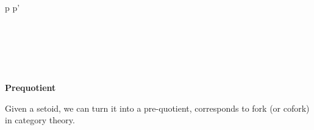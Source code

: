 {\begin{code}
\\
\>    \AgdaSymbol{=}      \AgdaSymbol{\_}  \AgdaSymbol{\_)} \AgdaSymbol{(} \AgdaSymbol{\{}p \AgdaSymbol{=} \AgdaSymbol{\}} \AgdaSymbol{\{}p' \AgdaSymbol{=} \AgdaSymbol{\})}\<%
\\
%
\\
\> \AgdaSymbol{:} \AgdaSymbol{\{} \AgdaSymbol{:} \AgdaSymbol{\}\{} \AgdaSymbol{:} \AgdaSymbol{\}\{}  \AgdaSymbol{:} \AgdaSymbol{\}(} \AgdaSymbol{:}   \AgdaSymbol{)\{} \AgdaSymbol{:} \AgdaSymbol{\}}\<%
\\
\>[0]\<[7]%
\>[7]   \AgdaBound{\_}  \AgdaSymbol{)}    \<%
\\
\>  \AgdaSymbol{=} \<%
\\
%
\\
\>\<\end{code}
}

\textbf{Prequotient}

Given a setoid, we can turn it into a pre-quotient, corresponds to 
fork (or cofork) in category theory.

